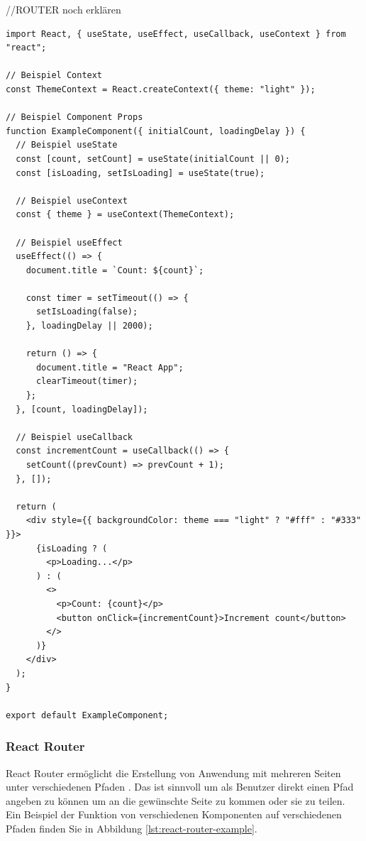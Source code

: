 \documentclass[a4paper,12pt]{report}
\begin{document}
//ROUTER noch erklären
\begin{lstlisting}[style=codeStyle, caption={Beispiel einer React Komponente}, label={lst:react-example}]
import React, { useState, useEffect, useCallback, useContext } from "react";

// Beispiel Context
const ThemeContext = React.createContext({ theme: "light" });

// Beispiel Component Props
function ExampleComponent({ initialCount, loadingDelay }) {
  // Beispiel useState
  const [count, setCount] = useState(initialCount || 0);
  const [isLoading, setIsLoading] = useState(true);

  // Beispiel useContext
  const { theme } = useContext(ThemeContext);

  // Beispiel useEffect
  useEffect(() => {
    document.title = `Count: ${count}`;

    const timer = setTimeout(() => {
      setIsLoading(false);
    }, loadingDelay || 2000);

    return () => {
      document.title = "React App";
      clearTimeout(timer);
    };
  }, [count, loadingDelay]);
  
  // Beispiel useCallback
  const incrementCount = useCallback(() => {
    setCount((prevCount) => prevCount + 1);
  }, []);

  return (
    <div style={{ backgroundColor: theme === "light" ? "#fff" : "#333" }}>
      {isLoading ? (
        <p>Loading...</p>
      ) : (
        <>
          <p>Count: {count}</p>
          <button onClick={incrementCount}>Increment count</button>
        </>
      )}
    </div>
  );
}

export default ExampleComponent;
\end{lstlisting}

\subsubsection{React Router}
\label{sec:react-router}
React Router ermöglicht die Erstellung von Anwendung mit mehreren Seiten unter verschiedenen Pfaden \cite{react-key-concepts}. Das ist sinnvoll um als Benutzer direkt einen Pfad angeben zu können um an die gewünschte Seite zu kommen oder sie zu teilen. Ein Beispiel der Funktion von verschiedenen Komponenten auf verschiedenen Pfaden finden Sie in Abbildung \ref{lst:react-router-example}. 
\end{document}
